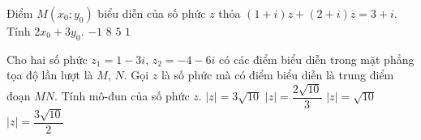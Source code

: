 \begin{ex}%
	Điểm $M(x_0;y_0)$ biểu diễn của số phức $z$ thỏa $(1+i)z+(2+i)\overline{z}=3+i$. Tính $2x_0+3y_0$.
	\choice
	{$-1$}
	{$8$}
	{\True $5$}
	{$1$}
\end{ex}

\begin{ex}%
	Cho hai số phức $z_1=1-3i$,  $z_2=-4-6i$ có các điểm biểu diễn trong mặt phẳng tọa độ lần lượt là $M$, $N$. Gọi $z$ là số phức mà có  điểm biểu diễn là trung điểm đoạn $MN$. Tính mô-đun của số phức $z$.
	\choice
	{$\left|z \right|=3\sqrt{10}$}
	{ $\left|z \right|=\dfrac{2\sqrt{10}}{3}$}
	{$\left|z \right|=\sqrt{10}$}
	{\True $\left|z \right|=\dfrac{3\sqrt{10}}{2} $}
\end{ex}


